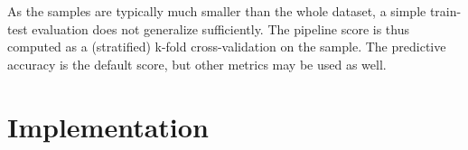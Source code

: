 As the samples are typically much smaller than the whole dataset, a simple
train-test evaluation does not generalize sufficiently. The pipeline score
is thus computed as a (stratified) k-fold cross-validation on the sample.
The predictive accuracy is the default score, but other metrics may be used
as well.
\section{Implementation}













